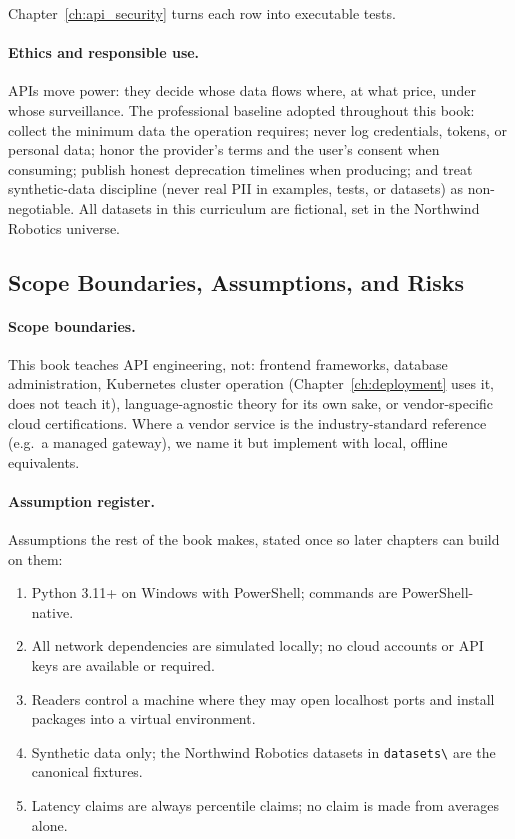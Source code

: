 Chapter~\ref{ch:api_security} turns each row into executable tests.

\paragraph{Ethics and responsible use.}
APIs move power: they decide whose data flows where, at what price, under
whose surveillance. The professional baseline adopted throughout this book:
collect the minimum data the operation requires; never log credentials,
tokens, or personal data; honor the provider's terms and the user's consent
when consuming; publish honest deprecation timelines when producing; and
treat synthetic-data discipline (never real PII in examples, tests, or
datasets) as non-negotiable. All datasets in this curriculum are fictional,
set in the Northwind Robotics universe.

\subsection{Scope Boundaries, Assumptions, and Risks}
\label{sec:ch0-scope}

\paragraph{Scope boundaries.}
This book teaches API engineering, not: frontend frameworks, database
administration, Kubernetes cluster operation (Chapter~\ref{ch:deployment}
uses it, does not teach it), language-agnostic theory for its own sake, or
vendor-specific cloud certifications. Where a vendor service is the
industry-standard reference (e.g.\ a managed gateway), we name it but
implement with local, offline equivalents.

\paragraph{Assumption register.}
Assumptions the rest of the book makes, stated once so later chapters can
build on them:

\begin{enumerate}[label=\textbf{A\arabic*.}]
  \item Python 3.11+ on Windows with PowerShell; commands are
        PowerShell-native.
  \item All network dependencies are simulated locally; no cloud accounts or
        API keys are available or required.
  \item Readers control a machine where they may open localhost ports and
        install packages into a virtual environment.
  \item Synthetic data only; the Northwind Robotics datasets in
        \texttt{datasets\textbackslash} are the canonical fixtures.
  \item Latency claims are always percentile claims; no claim is made from
        averages alone.
\end{enumerate}

